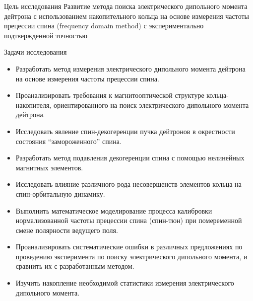 \documentclass[14pt]{beamer}
\begin{document}
\begin{frame}{Цель исследования}
Развитие метода поиска электрического дипольного момента дейтрона с использованием накопительного кольца на основе измерения частоты прецессии спина (frequency domain method) с экспериментально подтвержденной точностью
\end{frame}
\begin{frame}{Задачи исследования}
	\begin{itemize}
		\item Разработать метод измерения электрического дипольного момента дейтрона на основе измерения частоты прецессии спина.
		\item Проанализировать требования к магнитооптической структуре кольца-накопителя, ориентированного на поиск электрического дипольного момента дейтрона.
		\item Исследовать явление спин-декогеренции пучка дейтронов в окрестности состояния ``замороженного'' спина. 
	\end{itemize}
\end{frame}
\begin{frame}
	\begin{itemize} 
		\item Разработать метод подавления декогеренции спина с помощью нелинейных магнитных элементов.
		\item Исследовать влияние различного рода несовершенств элементов кольца на спин-орбитальную динамику. 
		\item Выполнить математическое моделирование процесса калибровки нормализованной частоты прецессии спина (спин-тюн) при помеременной смене полярности ведущего поля.
	\end{itemize}
\end{frame}
\begin{frame}
	\begin{itemize}
		\item Проанализировать систематические ошибки в различных предложениях по проведению эксперимента по поиску электрического дипольного момента, и сравнить их с разработанным методом. 
		\item Изучить накопление необходимой статистики измерения электрического дипольного момента.
	\end{itemize}
\end{frame}
\end{document}

